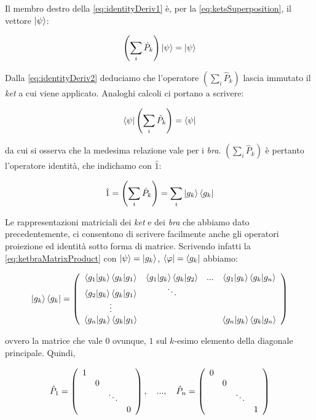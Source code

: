 Il membro destro della \eqref{eq:identityDeriv1} è, per la \eqref{eq:ketsSuperposition}, il vettore $\ket{\psi}$:

	\begin{equation} \label{eq:identityDeriv2}
		\left ( \sum_i \hat{P}_k \right ) \ket{\psi} = \ket{\psi}
	\end{equation}

Dalla \eqref{eq:identityDeriv2} deduciamo che l'operatore $\left ( \sum_i \hat{P}_k \right )$ lascia immutato il \textit{ket} a cui viene applicato. Analoghi calcoli ci portano a scrivere:

	\begin{equation}
		\bra{\psi} \left ( \sum_i \hat{P}_k \right ) = \bra{\psi}
	\end{equation}

da cui si osserva che la medesima relazione vale per i \textit{bra}. $\left ( \sum_i \hat{P}_k \right )$ è pertanto l'operatore identità, che indichamo con $\hat{1}$:

	\[
		\hat{1} =  \left ( \sum_i \hat{P}_k \right ) = \sum_i \ket{g_k} \bra{g_k}
	\]

Le rappresentazioni matriciali dei \textit{ket} e dei \textit{bra} che abbiamo dato precedentemente, ci consentono di scrivere facilmente anche gli operatori proiezione ed identità sotto forma di matrice. Scrivendo infatti la \eqref{eq:ketbraMatrixProduct} con $\ket{\psi} = \ket{g_k}$, $\bra{\varphi} = \bra{g_k}$ abbiamo:

	\begin{equation}
		\ket{g_k}\bra{g_k} = 
		\left ( \begin{array}{c c c c}
			\braket{g_1}{g_k} \braket{g_k}{g_1} & \braket{g_1}{g_k}\braket{g_k}{g_2} & ... & \braket{g_1}{g_k} \braket{g_k}{g_n} \\
			\braket{g_2}{g_k} \braket{g_k}{g_1} & \ddots &  & \\
			\vdots & & & \\
			\braket{g_n}{g_k} \braket{g_k}{g_1}& & & \braket{g_n}{g_k} \braket{g_k}{g_n}
		\end{array} \right )
	\end{equation}

ovvero la matrice che vale $0$ ovunque, $1$ sul $k$-esimo elemento della diagonale principale. Quindi,

	\begin{equation}
		\hat{P}_1 = 
		\left ( \begin{array}{c c c c}
			1 & & & \\
			& 0 & & \\
			& & \ddots & \\
			& & & 0 \\
		\end{array} \right ), \quad ..., \quad
		\hat{P}_n = 
		\left ( \begin{array}{c c c c}
			0 & & & \\
			& 0 & & \\
			& & \ddots & \\
			& & & 1 \\
		\end{array} \right )
	\end{equation}

